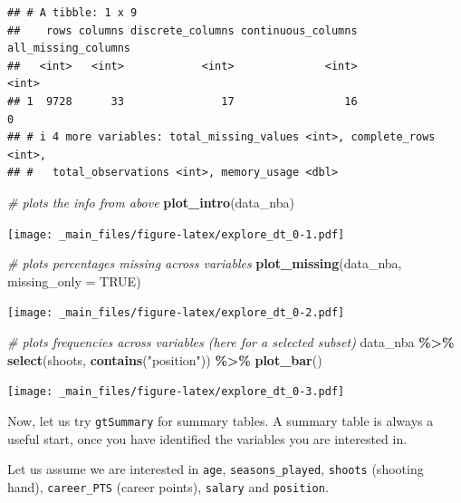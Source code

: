 \documentclass[
]{book}
\newenvironment{Shaded}{\begin{snugshade}}{\end{snugshade}}
\newcommand{\AttributeTok}[1]{\textcolor[rgb]{0.13,0.29,0.53}{#1}}
\newcommand{\CommentTok}[1]{\textcolor[rgb]{0.56,0.35,0.01}{\textit{#1}}}
\newcommand{\ConstantTok}[1]{\textcolor[rgb]{0.56,0.35,0.01}{#1}}
\newcommand{\FunctionTok}[1]{\textcolor[rgb]{0.13,0.29,0.53}{\textbf{#1}}}
\newcommand{\NormalTok}[1]{#1}
\newcommand{\SpecialCharTok}[1]{\textcolor[rgb]{0.81,0.36,0.00}{\textbf{#1}}}
\newcommand{\StringTok}[1]{\textcolor[rgb]{0.31,0.60,0.02}{#1}}
\begin{document}
\begin{verbatim}
## # A tibble: 1 x 9
##    rows columns discrete_columns continuous_columns all_missing_columns
##   <int>   <int>            <int>              <int>               <int>
## 1  9728      33               17                 16                   0
## # i 4 more variables: total_missing_values <int>, complete_rows <int>,
## #   total_observations <int>, memory_usage <dbl>
\end{verbatim}

\begin{Shaded}
\begin{Highlighting}[]
\CommentTok{\# plots the info from above}
\FunctionTok{plot\_intro}\NormalTok{(data\_nba)}
\end{Highlighting}
\end{Shaded}

\texttt{[image: \_main\_files/figure-latex/explore\_dt\_0-1.pdf]}

\begin{Shaded}
\begin{Highlighting}[]
\CommentTok{\# plots percentages missing across variables}
\FunctionTok{plot\_missing}\NormalTok{(data\_nba, }\AttributeTok{missing\_only =} \ConstantTok{TRUE}\NormalTok{)}
\end{Highlighting}
\end{Shaded}

\texttt{[image: \_main\_files/figure-latex/explore\_dt\_0-2.pdf]}

\begin{Shaded}
\begin{Highlighting}[]
\CommentTok{\# plots frequencies across variables (here for a selected subset)}
\NormalTok{data\_nba }\SpecialCharTok{\%\textgreater{}\%} 
  \FunctionTok{select}\NormalTok{(shoots, }\FunctionTok{contains}\NormalTok{(}\StringTok{"position"}\NormalTok{)) }\SpecialCharTok{\%\textgreater{}\%} 
  \FunctionTok{plot\_bar}\NormalTok{()}
\end{Highlighting}
\end{Shaded}

\texttt{[image: \_main\_files/figure-latex/explore\_dt\_0-3.pdf]}

Now, let us try \texttt{gtSummary} for summary tables. A summary table is always a useful start, once you have identified the variables you are interested in.

Let us assume we are interested in \texttt{age}, \texttt{seasons\_played}, \texttt{shoots} (shooting hand), \texttt{career\_PTS} (career points), \texttt{salary} and \texttt{position}.
\end{document}
